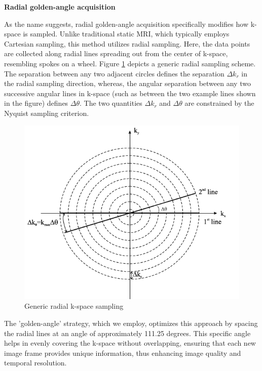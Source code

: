 \documentclass{micro-econ-thesis}
\begin{document}
\textbf{Radial golden-angle acquisition}


As the name suggests, radial golden-angle acquisition specifically modifies how k-space is sampled. Unlike traditional static MRI, which typically employs Cartesian sampling, this method utilizes radial sampling. Here, the data points are collected along radial lines spreading out from the center of k-space, resembling spokes on a wheel. Figure \ref{fig:radial} depicts a generic radial sampling scheme. The separation between any two adjacent circles defines the separation $\Delta k_r$ in the radial sampling direction, whereas, the angular separation between any two successive angular lines in k-space (such as between the two example lines shown in the figure) defines $\Delta \theta$. The two quantities $\Delta k_r$ and $\Delta \theta$ are constrained by the Nyquist sampling criterion. \parencite{brown_magnetic_2014} 
  
 \begin{figure}
 	\centering
 	\includegraphics[width=0.7\linewidth]{radial}
 	\caption{Generic radial k-space sampling \parencite[p.306]{brown_magnetic_2014}}
 	\label{fig:radial}
 \end{figure}
 
 The 'golden-angle' strategy, which we employ, optimizes this approach by spacing the radial lines at an angle of approximately 111.25 degrees. This specific angle helps in evenly covering the k-space without overlapping, ensuring that each new image frame provides unique information, thus enhancing image quality and temporal resolution. 
 
\end{document}
